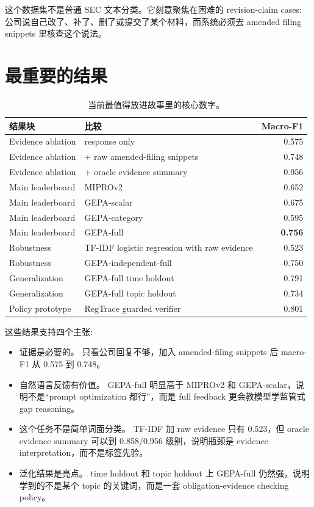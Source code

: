 \documentclass[11pt,fontset=none]{ctexart}
\newcommand{\good}[1]{\textcolor{blue!70!black}{#1}}
\begin{document}
这个数据集不是普通 SEC 文本分类。它刻意聚焦在困难的 revision-claim cases: 公司说自己改了、补了、删了或提交了某个材料，而系统必须去 amended filing snippets 里核查这个说法。

\section*{最重要的结果}

\begin{table}[h]
\centering
\small
\begin{tabularx}{\linewidth}{lXr}
\toprule
\textbf{结果块} & \textbf{比较} & \textbf{Macro-F1} \\
\midrule
Evidence ablation & response only & 0.575 \\
Evidence ablation & + raw amended-filing snippets & 0.748 \\
Evidence ablation & + oracle evidence summary & 0.956 \\
\midrule
Main leaderboard & MIPROv2 & 0.652 \\
Main leaderboard & GEPA-scalar & 0.675 \\
Main leaderboard & GEPA-category & 0.595 \\
Main leaderboard & GEPA-full & \textbf{0.756} \\
\midrule
Robustness & TF-IDF logistic regression with raw evidence & 0.523 \\
Robustness & GEPA-independent-full & 0.750 \\
Generalization & GEPA-full time holdout & 0.791 \\
Generalization & GEPA-full topic holdout & 0.734 \\
Policy prototype & RegTrace guarded verifier & 0.801 \\
\bottomrule
\end{tabularx}
\caption{当前最值得放进故事里的核心数字。}
\end{table}

这些结果支持四个主张:
\begin{itemize}
    \item \good{证据是必要的。} 只看公司回复不够，加入 amended-filing snippets 后 macro-F1 从 0.575 到 0.748。
    \item \good{自然语言反馈有价值。} GEPA-full 明显高于 MIPROv2 和 GEPA-scalar，说明不是``prompt optimization 都行''，而是 full feedback 更会教模型学监管式 gap reasoning。
    \item \good{这个任务不是简单词面分类。} TF-IDF 加 raw evidence 只有 0.523，但 oracle evidence summary 可以到 0.858/0.956 级别，说明瓶颈是 evidence interpretation，而不是标签先验。
    \item \good{泛化结果是亮点。} time holdout 和 topic holdout 上 GEPA-full 仍然强，说明学到的不是某个 topic 的关键词，而是一套 obligation-evidence checking policy。
\end{itemize}
\end{document}

